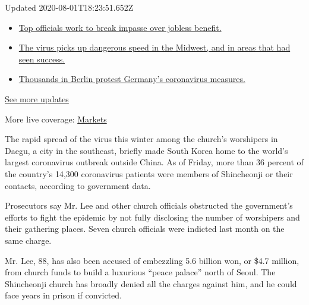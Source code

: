 Updated 2020-08-01T18:23:51.652Z

\begin{itemize}
\tightlist
\item
  \href{https://www.nytimes.com/2020/08/01/world/coronavirus-covid-19.html?action=click\&pgtype=Article\&state=default\&region=MAIN_CONTENT_1\&context=storylines_live_updates\#link-3ac56579}{Top
  officials work to break impasse over jobless benefit.}
\item
  \href{https://www.nytimes.com/2020/08/01/world/coronavirus-covid-19.html?action=click\&pgtype=Article\&state=default\&region=MAIN_CONTENT_1\&context=storylines_live_updates\#link-8796723}{The
  virus picks up dangerous speed in the Midwest, and in areas that had
  seen success.}
\item
  \href{https://www.nytimes.com/2020/08/01/world/coronavirus-covid-19.html?action=click\&pgtype=Article\&state=default\&region=MAIN_CONTENT_1\&context=storylines_live_updates\#link-25930521}{Thousands
  in Berlin protest Germany's coronavirus measures.}
\end{itemize}

\href{https://www.nytimes.com/2020/08/01/world/coronavirus-covid-19.html?action=click\&pgtype=Article\&state=default\&region=MAIN_CONTENT_1\&context=storylines_live_updates}{See
more updates}

More live coverage:
\href{https://www.nytimes.com/live/2020/07/31/business/stock-market-today-coronavirus?action=click\&pgtype=Article\&state=default\&region=MAIN_CONTENT_1\&context=storylines_live_updates}{Markets}

The rapid spread of the virus this winter among the church's worshipers
in Daegu, a city in the southeast, briefly made South Korea home to the
world's largest coronavirus outbreak outside China. As of Friday, more
than 36 percent of the country's 14,300 coronavirus patients were
members of Shincheonji or their contacts, according to government data.

Prosecutors say Mr. Lee and other church officials obstructed the
government's efforts to fight the epidemic by not fully disclosing the
number of worshipers and their gathering places. Seven church officials
were indicted last month on the same charge.

Mr. Lee, 88, has also been accused of embezzling 5.6 billion won, or
\$4.7 million, from church funds to build a luxurious ``peace palace''
north of Seoul. The Shincheonji church has broadly denied all the
charges against him, and he could face years in prison if convicted.

